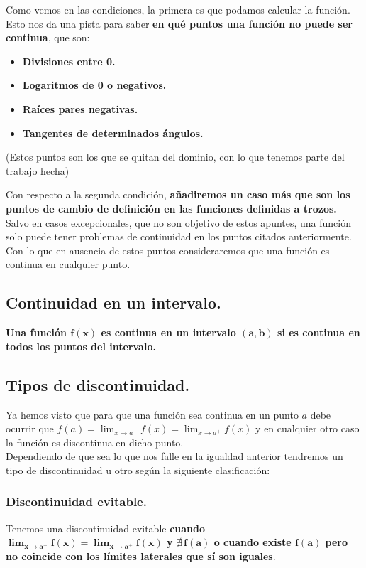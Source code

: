 \documentclass[a4paper,11pt,answers]{exam}
\begin{document}
Como vemos en las condiciones, la primera es que podamos calcular la función. Esto nos da una pista para saber \textbf{en qué puntos una función no puede ser continua}, que son:
\begin{itemize}
	\item \textbf{Divisiones entre 0.}
	\item \textbf{Logaritmos de 0 o negativos.}
	\item \textbf{Raíces pares negativas.}
	\item \textbf{Tangentes de determinados ángulos.}
\end{itemize}
\begin{small}
(Estos puntos son los que se quitan del dominio, con lo que tenemos parte del trabajo hecha)\\
\end{small}

Con respecto a la segunda condición, \textbf{añadiremos un caso más que son los puntos de cambio de definición en las funciones definidas a trozos.}\\

Salvo en casos excepcionales, que no son objetivo de estos apuntes, una función solo puede tener problemas de continuidad en los puntos citados anteriormente. Con lo que en ausencia de estos puntos consideraremos que una función es continua en cualquier punto.

\subsection{Continuidad en un intervalo.}
\textbf{Una función $\boldsymbol{f(x)}$ es continua en un intervalo $\boldsymbol{(a, b)}$ si es continua en todos los puntos del intervalo.}\\

\subsection{Tipos de discontinuidad.}
Ya hemos visto que para que una función sea continua en un punto $a$ debe ocurrir que $f(a) = \lim_{x \to a^-} f(x) =
\lim_{x \to a^+} f(x)$ y en cualquier otro caso la función es discontinua en dicho punto.\\
Dependiendo de que sea lo que nos falle en la igualdad anterior tendremos un tipo de discontinuidad u otro según la siguiente clasificación:
\subsubsection{Discontinuidad evitable.}
Tenemos una discontinuidad evitable \textbf{cuando $\boldsymbol{\lim_{x \to a^-} f(x) =
\lim_{x \to a^+} f(x)}$ y $\boldsymbol{\nexists\, f(a)}$ o cuando existe $\boldsymbol{f(a)}$ pero no coincide con los límites laterales que sí son iguales}.\\
\end{document}
